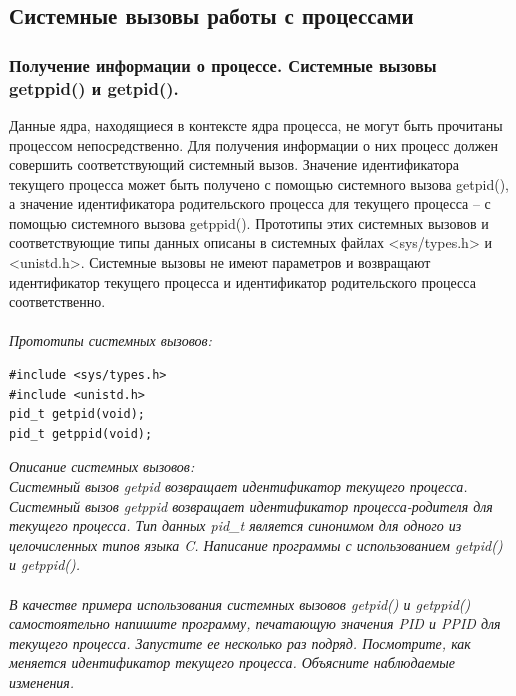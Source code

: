 \documentclass[a4paper]{article}
\begin{document}
\subsection{\Large Системные вызовы работы с процессами}
\subsubsection{\Large Получение информации о процессе. Системные вызовы getppid() и getpid().}
Данные ядра, находящиеся в контексте ядра процесса, не могут быть прочитаны процессом непосредственно. Для получения информации о них процесс должен совершить соответствующий системный вызов. Значение идентификатора текущего процесса может быть получено с помощью системного вызова getpid(), а значение идентификатора родительского процесса для текущего процесса – с помощью системного вызова getppid(). Прототипы этих системных вызовов и соответствующие типы данных описаны в системных файлах <sys/types.h> и <unistd.h>. Системные вызовы не имеют параметров и возвращают идентификатор текущего процесса и идентификатор родительского процесса
соответственно. \\\\
\sl Прототипы системных вызовов:
\begin{verbatim}
#include <sys/types.h>
#include <unistd.h>
pid_t getpid(void);
pid_t getppid(void);
\end{verbatim}
\sl Описание системных вызовов:\\
\rm Системный вызов getpid возвращает идентификатор текущего процесса. Системный вызов getppid возвращает идентификатор процесса-родителя для текущего процесса. Тип данных pid\_t является синонимом для одного из целочисленных типов языка C. Написание программы с использованием getpid() и getppid().\\\\
В качестве примера использования системных вызовов getpid() и getppid() самостоятельно напишите программу, печатающую значения PID и PPID для текущего процесса. Запустите ее несколько раз подряд. Посмотрите, как меняется идентификатор текущего процесса. Объясните наблюдаемые изменения.
\end{document}
